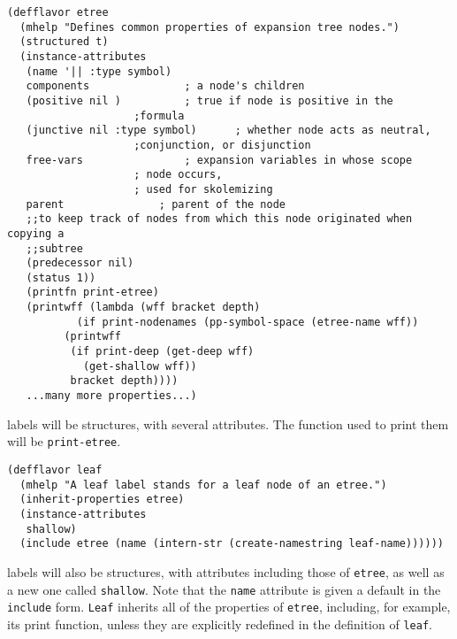 \begin{verbatim}
(defflavor etree
  (mhelp "Defines common properties of expansion tree nodes.")
  (structured t)
  (instance-attributes
   (name '|| :type symbol)
   components				; a node's children
   (positive nil )			; true if node is positive in the
					;formula
   (junctive nil :type symbol)		; whether node acts as neutral,
					;conjunction, or disjunction
   free-vars				; expansion variables in whose scope
					; node occurs,
					; used for skolemizing
   parent				; parent of the node
   ;;to keep track of nodes from which this node originated when copying a
   ;;subtree
   (predecessor nil)
   (status 1))
   (printfn print-etree)
   (printwff (lambda (wff bracket depth)
	       (if print-nodenames (pp-symbol-space (etree-name wff))
		 (printwff 
		  (if print-deep (get-deep wff)
		    (get-shallow wff))
		  bracket depth))))
   ...many more properties...)
\end{verbatim}

{\tt {}} labels will be structures, with several attributes.
The function used to print them will be {\tt print-etree}.

\begin{verbatim}
(defflavor leaf
  (mhelp "A leaf label stands for a leaf node of an etree.")
  (inherit-properties etree)
  (instance-attributes
   shallow)
  (include etree (name (intern-str (create-namestring leaf-name))))))
\end{verbatim}

{\tt {}} labels will also be structures, with attributes including
those of {\tt etree}, as well as a new one called {\tt shallow}.  Note that
the {\tt name} attribute is given a default in the {\tt include} form.
{\tt Leaf} inherits all of the properties of {\tt etree}, including, for
example, its print function, unless they are explicitly redefined in
the definition of {\tt leaf}.
